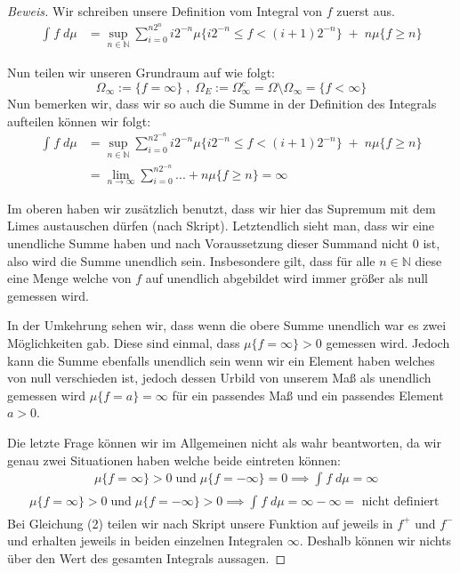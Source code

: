 \documentclass[10pt]{article}
\begin{document}
\begin{proof}[Beweis]
	Wir schreiben unsere Definition vom Integral von $f$ zuerst aus.
	\begin{align*}
		\int_{}^{} f \; d\mu &= \sup_{n \in \mathbb{N} } \sum_{i=0}^{n 2 ^{n}}
		i 2 ^{-n} \mu \{
			i 2 ^{-n} \leq f < (i+1) 2 ^{-n}
		\} \; + \; n \mu \{
			f \geq n
		\} 
	\end{align*}

	Nun teilen wir unseren Grundraum auf wie folgt:
	\[
	\Omega_\infty := \{
		f = \infty
	\}  \; , \;
	\Omega_E := \Omega_\infty ^{c}
	= \Omega \setminus \Omega_\infty
	= \{
		f < \infty
	\} 
	\] 
	Nun bemerken wir, dass wir so auch die Summe in der Definition des Integrals
	aufteilen können wir folgt:
	\begin{align*}
		\int_{}^{} f \; d\mu &= 
		\sup_{n \in \mathbb{N} } \sum_{i=0}^{n 2 ^{-n}} i 2 ^{-n}
		\mu \{
			i 2 ^{-n} \leq f < (i+1) 2 ^{-n}
		\} \; + \; n \mu \{
			f \geq n
		\} \\
		 &= \lim_{n \to \infty} \sum_{i=0}^{n 2 ^{ -n }} ... +
		 n \mu \{
		 	f \geq n
		 \} = \infty
	\end{align*}

	Im oberen haben wir zusätzlich benutzt, dass wir hier das Supremum mit dem
	Limes austauschen dürfen (nach Skript). Letztendlich sieht man, dass
	wir eine unendliche Summe haben und nach Voraussetzung dieser Summand
	nicht 0 ist, also wird die Summe unendlich sein. Insbesondere gilt, dass
	für alle $n \in \mathbb{N} $ diese eine Menge welche von $f$ auf unendlich
	abgebildet wird immer größer als null gemessen wird.


	In der Umkehrung sehen wir, dass wenn die obere Summe unendlich war es zwei
	Möglichkeiten gab. Diese sind einmal, dass $\mu \{
		f = \infty
	\} > 0$ gemessen wird. Jedoch kann die Summe ebenfalls unendlich sein wenn
	wir ein Element haben welches von null verschieden ist, jedoch dessen Urbild
	von unserem Maß als unendlich gemessen wird $\mu \{
		f = a
	\} = \infty$ für ein passendes Maß und ein passendes Element $a > 0$.


	Die letzte Frage können wir im Allgemeinen nicht als wahr beantworten, da
	wir genau zwei Situationen haben welche beide eintreten können:
	\begin{eqnarray}
		&\mu \{
			f = \infty
		\} > 0 \; \text{und} \;
		\mu \{
			f = - \infty
		\} = 0 \implies \int_{}^{} f \; d\mu = \infty
	\end{eqnarray}
	\begin{eqnarray}
		&\mu \{
			f = \infty
		\} > 0 \; \text{und} \;
		\mu \{
			f = - \infty
		\} > 0 \implies \int_{}^{} f \; d\mu = \infty - \infty
		= \text{ nicht definiert }
	\end{eqnarray}
	Bei Gleichung (2) teilen wir nach Skript unsere Funktion auf jeweils in
	$f ^{+}$  und $f ^{-}$ und erhalten jeweils in beiden einzelnen Integralen
	$\infty$. Deshalb können wir nichts über den Wert des gesamten Integrals
	aussagen.
\end{proof}
\end{document}
